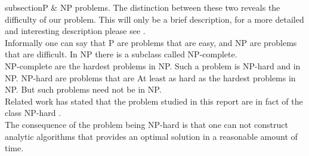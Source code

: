 subsection{P \& NP problems.}
The distinction between these two reveals the difficulty of our problem. This will only be a brief description, for a more detailed and interesting description please see \cite{NP}.\\
Informally one can say that P are problems that are easy, and NP are problems that are difficult. In NP there is a subclass called NP-complete.\\
NP-complete are the hardest problems in NP\cite{adk19}. Such a problem is NP-hard and in NP.
NP-hard are problems that are At least as hard as the hardest problems in NP. But such problems need not be in NP\cite{adk19}.\\
Related work has stated that the problem studied in this report are in fact of the class NP-hard \cite{paper1}.\\ %
The consequence of the problem being NP-hard is that one can not construct analytic algorithms that provides an optimal solution in a reasonable amount of time.







